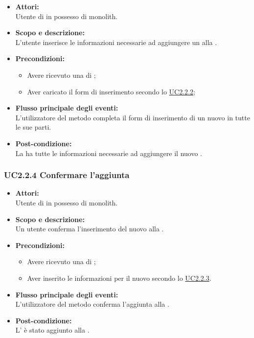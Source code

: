 \begin{itemize}
	\item \textbf{Attori:}
	\\Utente di  in possesso di monolith.
	\item \textbf{Scopo e descrizione:} 
	\\L'utente inserisce le informazioni necessarie ad aggiungere un  alla .
	\item \textbf{Precondizioni:}
	\begin{itemize}
		\item Avere ricevuto una  di ;
		\item Aver caricato il form di inserimento secondo lo \hyperref[UC2.2.2]{UC2.2.2};
	\end{itemize}
	\item \textbf{Flusso principale degli eventi:}
	\\L'utilizzatore del metodo completa il form di inserimento di un nuovo  in tutte le sue parti.
	\item \textbf{Post-condizione:}
	\\La {} ha tutte le informazioni necessarie ad aggiungere il nuovo .
\end{itemize}

\subsubsection{UC2.2.4 Confermare l'aggiunta} \label{UC2.2.4}

\begin{itemize}
	\item \textbf{Attori:}
	\\Utente di  in possesso di monolith.
	\item \textbf{Scopo e descrizione:} 
	\\Un utente conferma l'inserimento del nuovo  alla .
	\item \textbf{Precondizioni:}
	\begin{itemize}
		\item Avere ricevuto una  di ;
		\item Aver inserito le informazioni per il nuovo  secondo lo \hyperref[UC2.2.3]{UC2.2.3}.
	\end{itemize}
	\item \textbf{Flusso principale degli eventi:}
	\\L'utilizzatore del metodo conferma l'aggiunta alla .
	\item \textbf{Post-condizione:}
	\\L’ è stato aggiunto alla .
\end{itemize}

